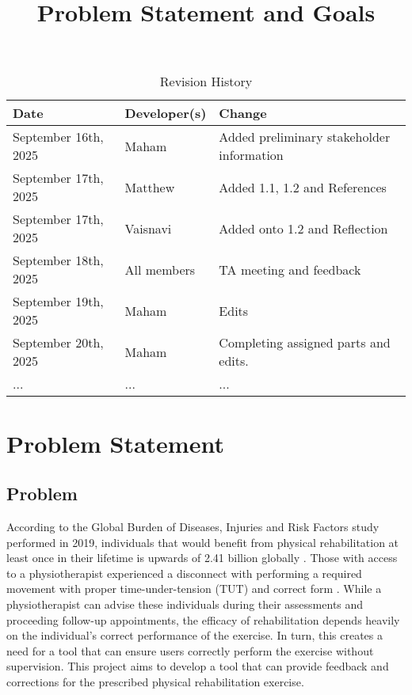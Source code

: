 \documentclass{article}
\title{Problem Statement and Goals\\\progname}
\author{\authname}
\date{}
\begin{document}
\maketitle

\begin{table}[hp]
\caption{Revision History} \label{TblRevisionHistory}
\begin{tabularx}{\textwidth}{llX}
\toprule
\textbf{Date} & \textbf{Developer(s)} & \textbf{Change}\\
\midrule
September 16th, 2025 & Maham & Added preliminary stakeholder information\\
September 17th, 2025 & Matthew & Added 1.1, 1.2 and References\\
September 17th, 2025 & Vaisnavi & Added onto 1.2 and Reflection\\
September 18th, 2025 & All members & TA meeting and feedback\\
September 19th, 2025 & Maham & Edits \\
September 20th, 2025 & Maham & Completing assigned parts and edits. \\
... & ... & ...\\
\bottomrule
\end{tabularx}
\end{table}

\section{Problem Statement}

\subsection{Problem}

According to the Global Burden of Diseases, Injuries and Risk Factors study performed in 2019, 
individuals that would benefit from physical rehabilitation at least once in their 
lifetime is upwards of 2.41 billion globally \citep{CiezaEtAl2021}.
Those with access to a physiotherapist experienced a 
disconnect with performing a required movement with proper time-under-tension (TUT) and 
correct form \citep{FaberEtAl2015}. While a physiotherapist can advise these individuals
during their assessments and proceeding follow-up appointments, the efficacy of rehabilitation
depends heavily on the individual's correct performance of the exercise. In turn, this creates a need for a tool that can ensure users 
correctly perform the exercise without supervision. This project aims to develop a tool that can 
provide feedback and corrections for the prescribed physical rehabilitation exercise.
\end{document}
